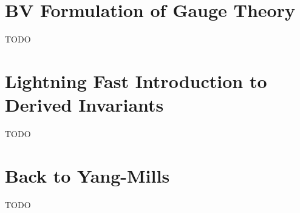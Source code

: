 \section{BV Formulation of Gauge Theory}

TODO

\section{Lightning Fast Introduction to Derived Invariants}

TODO

\section{Back to Yang-Mills}

TODO